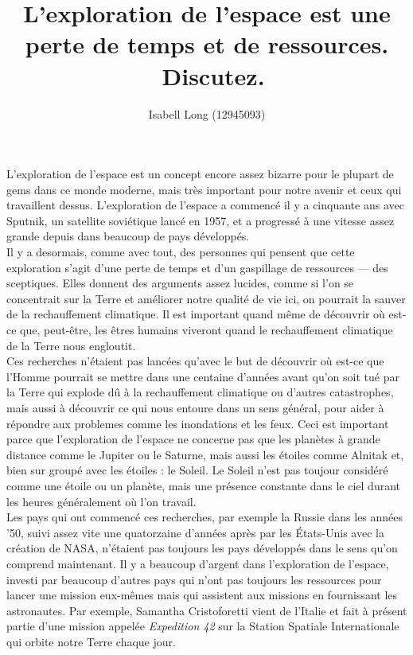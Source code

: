 \documentclass[12pt,a4paper]{article}
\begin{document}
\title{\og L'exploration de l'espace est une perte de temps et de
ressources. \fg~Discutez.}
\author{Isabell Long (12945093)}
\maketitle

L'exploration de l'espace est un concept encore assez bizarre pour le
plupart de gems dans ce monde moderne, mais très important pour notre
avenir et ceux qui travaillent dessus. L'exploration de l'espace a
commencé il y a cinquante ans avec Sputnik, un satellite soviétique
lancé en 1957, et a progressé à une vitesse assez grande depuis dans
beaucoup de pays développés.\\

Il y a desormais, comme avec tout, des personnes qui pensent que cette
exploration s'agit d'une perte de temps et d'un gaspillage de
ressources --- des sceptiques. Elles donnent des arguments assez
lucides, comme si l'on se concentrait sur la Terre et améliorer notre
qualité de vie ici, on pourrait la sauver de la rechauffement
climatique. Il est important quand même de découvrir où est-ce que,
peut-être, les êtres humains viveront quand le rechauffement
climatique de la Terre nous engloutit.\\

Ces recherches n'étaient pas lancées qu'avec le but de découvrir où
est-ce que l'Homme pourrait se mettre dans une centaine d'années avant
qu'on soit tué par la Terre qui explode dû à la rechauffement
climatique ou d'autres catastrophes, mais aussi à découvrir ce qui
nous entoure dans un sens général, pour aider à répondre aux problemes
comme les inondations et les feux. Ceci est important parce que
l'exploration de l'espace ne concerne pas que les planètes à grande
distance comme le Jupiter ou le Saturne, mais aussi les étoiles comme
Alnitak et, bien sur groupé avec les étoiles : le Soleil. Le Soleil
n'est pas toujour considéré comme une étoile ou un planète, mais une
présence constante dans le ciel durant les heures généralement où l'on
travail.\\

Les pays qui ont commencé ces recherches, par exemple la Russie dans
les années '50, suivi assez vite une quatorzaine d'années après par
les États-Unis avec la création de NASA, n'étaient pas toujours les
pays développés dans le sens qu'on comprend maintenant. Il y a
beaucoup d'argent dans l'exploration de l'espace, investi par beaucoup
d'autres pays qui n'ont pas toujours les ressources pour lancer une
mission eux-mêmes mais qui assistent aux missions en fournissant les
astronautes. Par exemple, Samantha Cristoforetti vient de l'Italie et
fait à présent partie d'une mission appelée \textit{Expedition 42}
sur la Station Spatiale Internationale qui orbite notre Terre chaque
jour.\\
\end{document}
